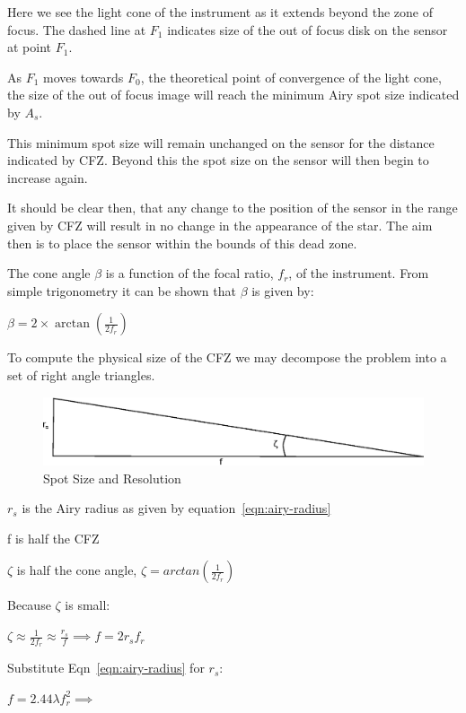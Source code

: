 \documentclass[11pt]{article}
\begin{document}
Here we see the light cone of the instrument as it extends beyond the zone of focus.  The dashed line at $F_{1}$ indicates size of the out of focus disk on the sensor at point $F_{1}$.  

As $F_{1}$ moves towards $F_{0}$, the theoretical point of convergence of the light cone, the size of the out of focus image will reach the minimum Airy spot size indicated by $A_{s}$.  

This minimum spot size will remain unchanged on the sensor for the distance indicated by CFZ. Beyond this the spot size on the sensor will then begin to increase again.  

It should be clear then, that any change to the position of the sensor in the range given by CFZ will result in no change in the appearance of the star.  The aim then is to place the sensor within the bounds of this dead zone.

The cone angle $\beta$ is a function of the focal ratio, $f_{r}$, of the instrument.  From simple trigonometry it can be shown that $\beta$ is given by:

$\beta=2\times\arctan(\frac{1}{2f_{r}})$

To compute the physical size of the CFZ we may decompose the problem into a set of right angle triangles.

\begin{figure}[htb]
	\begin{center}
		\includegraphics[]{CFZ-computation.eps}
		\caption{Spot Size and Resolution}
		\label{fig:cfz-computation}
	\end{center}
\end{figure}

$r_{s}$ is the Airy radius as given by equation~\ref{eqn:airy-radius}

f is half the CFZ

$\zeta$ is half the cone angle, $\zeta = arctan(\frac{1}{2f_{r}})$

Because $\zeta$ is small:

\Large
$\zeta \approx \frac{1}{2f_{r}} \approx \frac{r_{s}}{f} \implies f=2r_{s}f_{r}$
\large

Substitute Eqn~\ref{eqn:airy-radius} for $r_{s}$:

$f=2.44\lambda f_{r}^2 \implies$
\end{document}
